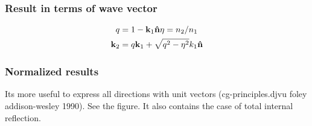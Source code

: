 \documentclass[11pt]{article}
\begin{document}
\subsubsection{Result in terms of wave vector}
\begin{align}
  q &= 1-\mathbf{k}_1 \mathbf{\hat{n}} \eta = n_2/n_1\\
  \mathbf{k}_2 &= q \mathbf{k}_1 + \sqrt{q^2-\eta^2} k_1\mathbf{\hat{n}}
\end{align}
\subsubsection{Normalized results}
Its more useful to express all directions with unit vectors
(cg-principles.djvu foley addison-wesley 1990). See the figure.
It also contains the case of total internal reflection.
 \begin{figure} 
   \centering
   
 \end{figure}
\end{document}
